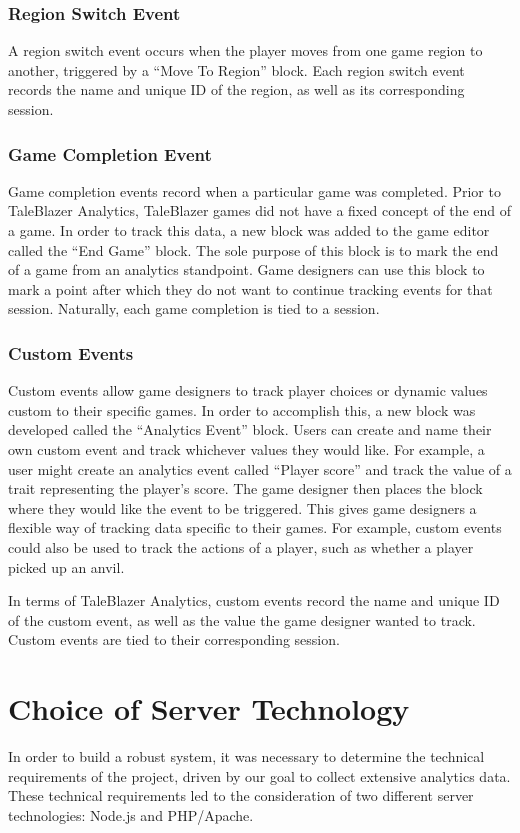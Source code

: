\subsubsection{Region Switch Event}

A region switch event occurs when the player moves from one game region to another, triggered by a ``Move To Region'' block. Each region switch event records the name and unique ID of the region, as well as its corresponding session.

\subsubsection{Game Completion Event}

Game completion events record when a particular game was completed. Prior to TaleBlazer Analytics, TaleBlazer games did not have a fixed concept of the end of a game. In order to track this data, a new block was added to the game editor called the ``End Game'' block. The sole purpose of this block is to mark the end of a game from an analytics standpoint. Game designers can use this block to mark a point after which they do not want to continue tracking events for that session. Naturally, each game completion is tied to a session. 

\subsubsection{Custom Events}

Custom events allow game designers to track player choices or dynamic values custom to their specific games. In order to accomplish this, a new block was developed called the ``Analytics Event'' block. Users can create and name their own custom event and track whichever values they would like. For example, a user might create an analytics event called ``Player score'' and track the value of a trait representing the player's score. The game designer then places the block where they would like the event to be triggered. This gives game designers  a flexible way of tracking data specific to their games. For example, custom events could also be used to track the actions of a player, such as whether a player picked up an anvil. 

In terms of TaleBlazer Analytics, custom events record the name and unique ID of the custom event, as well as the value the game designer wanted to track. Custom events are tied to their corresponding session.

\section{Choice of Server Technology}
In order to build a robust system, it was necessary to determine the technical requirements of the project, driven by our goal to collect extensive analytics data. These technical requirements led to the consideration of two different server technologies: Node.js and PHP/Apache. 

